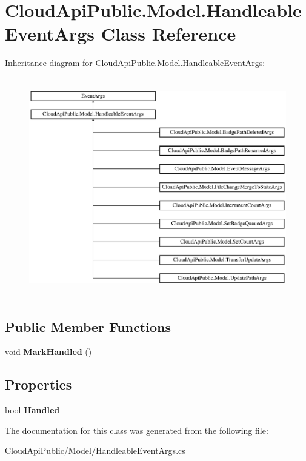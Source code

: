 \hypertarget{class_cloud_api_public_1_1_model_1_1_handleable_event_args}{\section{Cloud\-Api\-Public.\-Model.\-Handleable\-Event\-Args Class Reference}
\label{class_cloud_api_public_1_1_model_1_1_handleable_event_args}
}
Inheritance diagram for Cloud\-Api\-Public.\-Model.\-Handleable\-Event\-Args\-:\begin{figure}[H]
\begin{center}
\leavevmode
\includegraphics[height=9.595016cm]{class_cloud_api_public_1_1_model_1_1_handleable_event_args}
\end{center}
\end{figure}
\subsection*{Public Member Functions}
\begin{DoxyCompactItemize}
\item 
\hypertarget{class_cloud_api_public_1_1_model_1_1_handleable_event_args_a5d7c3225ae4c90306f4f67f160774660}{void {\bfseries Mark\-Handled} ()}\label{class_cloud_api_public_1_1_model_1_1_handleable_event_args_a5d7c3225ae4c90306f4f67f160774660}

\end{DoxyCompactItemize}
\subsection*{Properties}
\begin{DoxyCompactItemize}
\item 
\hypertarget{class_cloud_api_public_1_1_model_1_1_handleable_event_args_a6c8c746a4b90f41721b56cb1d04b6eb2}{bool {\bfseries Handled}}\label{class_cloud_api_public_1_1_model_1_1_handleable_event_args_a6c8c746a4b90f41721b56cb1d04b6eb2}

\end{DoxyCompactItemize}


The documentation for this class was generated from the following file\-:\begin{DoxyCompactItemize}
\item 
Cloud\-Api\-Public/\-Model/Handleable\-Event\-Args.\-cs\end{DoxyCompactItemize}
